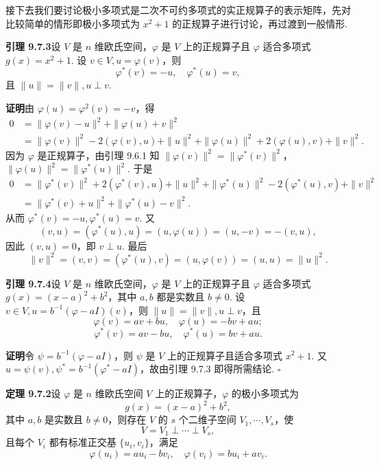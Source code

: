 \documentclass[UTF8, 12pt, fontset=fandol, oneside]{ctexart}
\begin{document}
接下去我们要讨论极小多项式是二次不可约多项式的实正规算子的表示矩阵，先对比较简单的情形即极小多项式为 $x^2+1$ 的正规算子进行讨论，再过渡到一般情形.

\noindent\textbf{引理 9.7.3}\quad 设 $V$ 是 $n$ 维欧氏空间，$\varphi$ 是 $V$ 上的正规算子且 $\varphi$ 适合多项式 $g(x)=x^2+1$. 设 $v\in V,u=\varphi(v)$，则
\[
  \varphi^*(v)=-u,\quad \varphi^*(u)=v,
\]
且 $\|u\|=\|v\|,u\perp v$.

\noindent\textbf{证明}\quad 由 $\varphi(u)=\varphi^2(v)=-v$，得
\[
\begin{aligned}
  0
  &= \|\varphi(v)-u\|^2+\|\varphi(u)+v\|^2\\
  &= \|\varphi(v)\|^2-2(\varphi(v),u)+\|u\|^2
     +\|\varphi(u)\|^2+2(\varphi(u),v)+\|v\|^2.
\end{aligned}
\]
因为 $\varphi$ 是正规算子，由引理 9.6.1 知 $\|\varphi(v)\|^2=\|\varphi^*(v)\|^2$，$\|\varphi(u)\|^2=\|\varphi^*(u)\|^2$. 于是
\[
\begin{aligned}
  0
  &= \|\varphi^*(v)\|^2+2(\varphi^*(v),u)+\|u\|^2
     +\|\varphi^*(u)\|^2-2(\varphi^*(u),v)+\|v\|^2\\
  &= \|\varphi^*(v)+u\|^2+\|\varphi^*(u)-v\|^2.
\end{aligned}
\]
从而 $\varphi^*(v)=-u,\varphi^*(u)=v$. 又
\[
  (v,u)=(\varphi^*(u),u)=(u,\varphi(u))=(u,-v)=-(v,u),
\]
因此 $(v,u)=0$，即 $v\perp u$. 最后
\[
  \|v\|^2=(v,v)=(\varphi^*(u),v)=(u,\varphi(v))=(u,u)=\|u\|^2.
\]

\noindent\textbf{引理 9.7.4}\quad 设 $V$ 是 $n$ 维欧氏空间，$\varphi$ 是 $V$ 上的正规算子且 $\varphi$ 适合多项式 $g(x)=(x-a)^2+b^2$，其中 $a,b$ 都是实数且 $b\ne0$. 设 $v\in V,u=b^{-1}(\varphi-aI)(v)$，则 $\|u\|=\|v\|,u\perp v$，且
\[
  \varphi(v)=av+bu,\quad \varphi(u)=-bv+au;
\]
\[
  \varphi^*(v)=av-bu,\quad \varphi^*(u)=bv+au.
\]

\noindent\textbf{证明}\quad 令 $\psi=b^{-1}(\varphi-aI)$，则 $\psi$ 是 $V$ 上的正规算子且适合多项式 $x^2+1$. 又 $u=\psi(v),\psi^*=b^{-1}(\varphi^*-aI)$，故由引理 9.7.3 即得所需结论. $\square$

\noindent\textbf{定理 9.7.2}\quad 设 $\varphi$ 是 $n$ 维欧氏空间 $V$ 上的正规算子，$\varphi$ 的极小多项式为
\[
  g(x)=(x-a)^2+b^2,
\]
其中 $a,b$ 是实数且 $b\ne0$，则存在 $V$ 的 $s$ 个二维子空间 $V_1,\cdots,V_s$，使
\[
  V=V_1\perp\cdots\perp V_s,
\]
且每个 $V_i$ 都有标准正交基 $\{u_i,v_i\}$，满足
\begin{equation}
  \varphi(u_i)=au_i-bv_i,\quad \varphi(v_i)=bu_i+av_i.
  \tag{9.7.2}
\end{equation}
\end{document}
